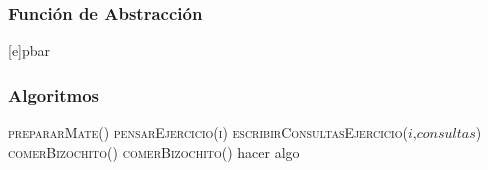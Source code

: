 \subsubsection*{Función de Abstracción}
[e]{p}{bar}

\subsubsection*{Algoritmos}
\begin{algorithm}[H]
  \begin{algorithmic}[1]
    \State{} 
    \State{} 
    \State{}
    \State\textsc{prepararMate()} 
    \State\textsc{pensarEjercicio(i)}
      \State\textsc{escribirConsultasEjercicio($i$,$consultas$)}
    \Else
      \State\textsc{comerBizochito()}
    \EndIf
      \State\textsc{comerBizochito()}
    \EndWhile
         \State hacer algo
    \EndFor
    \State{}
  \end{algorithmic}
\end{algorithm}
\newpage

